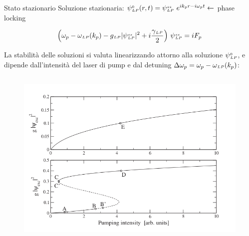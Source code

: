 \documentclass[10pt]{beamer}
\begin{document}
\begin{frame}{Stato stazionario}
%
Soluzione stazionaria: \( \psi{\scriptstyle ^{0}_{LP}}(r,t) = \psi{\scriptstyle ^{ss}_{LP}} \ e^{ik_pr - i\omega_p t}  \leftarrow\) \alert{phase locking}

\[
 \left( \omega_p - \omega{\scriptstyle _{LP}} (k_p) - g{\scriptstyle _{LP}} |\psi{\scriptstyle ^{ss}_{LP}}|^2 + i \frac{\gamma{\scriptstyle _{LP}}}{2} \right)\, \psi{\scriptstyle ^{ss}_{LP}} = i F_p
\]



\begin{figure}
 \end{figure}

La stabilità delle soluzioni si valuta linearizzando attorno alla soluzione $\psi{\scriptstyle ^{0}_{LP}}$, e dipende dall'intensità del laser di pump e dal detuning \(\Delta \omega_p = \omega_p - \omega{\scriptstyle _{LP}}(k_p)\):
\begin{columns}[t]
 \begin{column}{.5\textwidth}
  \begin{figure}
   \includegraphics[width=\columnwidth]{files/Shapevspump.png}
  \end{figure}

 \end{column}


\end{columns}
\end{frame}
\end{document}
